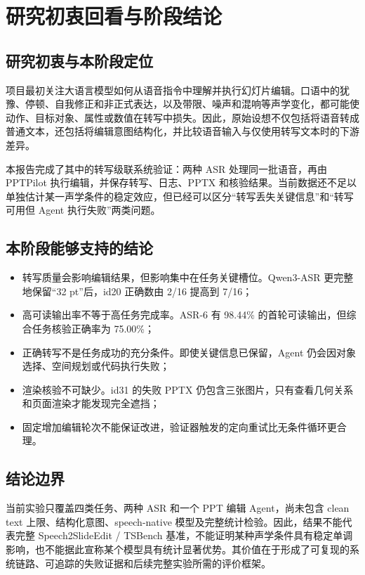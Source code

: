 \documentclass[11pt,a4paper,UTF8,fontset=fandol]{ctexart}
\begin{document}
\section{研究初衷回看与阶段结论}

\subsection{研究初衷与本阶段定位}

项目最初关注大语言模型如何从语音指令中理解并执行幻灯片编辑。口语中的犹豫、停顿、自我修正和非正式表达，以及带限、噪声和混响等声学变化，都可能使动作、目标对象、属性或数值在转写中损失。因此，原始设想不仅包括将语音转成普通文本，还包括将编辑意图结构化，并比较语音输入与仅使用转写文本时的下游差异。

本报告完成了其中的转写级联系统验证：两种 ASR 处理同一批语音，再由 PPTPilot 执行编辑，并保存转写、日志、PPTX 和核验结果。当前数据还不足以单独估计某一声学条件的稳定效应，但已经可以区分“转写丢失关键信息”和“转写可用但 Agent 执行失败”两类问题。

\subsection{本阶段能够支持的结论}

\begin{itemize}
  \item 转写质量会影响编辑结果，但影响集中在任务关键槽位。Qwen3-ASR 更完整地保留“32 pt”后，id20 正确数由 2/16 提高到 7/16；
  \item 高可读输出率不等于高任务完成率。ASR-6 有 98.44\% 的首轮可读输出，但综合任务核验正确率为 75.00\%；
  \item 正确转写不是任务成功的充分条件。即使关键信息已保留，Agent 仍会因对象选择、空间规划或代码执行失败；
  \item 渲染核验不可缺少。id31 的失败 PPTX 仍包含三张图片，只有查看几何关系和页面渲染才能发现完全遮挡；
  \item 固定增加编辑轮次不能保证改进，验证器触发的定向重试比无条件循环更合理。
\end{itemize}

\subsection{结论边界}

当前实验只覆盖四类任务、两种 ASR 和一个 PPT 编辑 Agent，尚未包含 clean text 上限、结构化意图、speech-native 模型及完整统计检验。因此，结果不能代表完整 Speech2SlideEdit / TSBench 基准，不能证明某种声学条件具有稳定单调影响，也不能据此宣称某个模型具有统计显著优势。其价值在于形成了可复现的系统链路、可追踪的失败证据和后续完整实验所需的评价框架。
\end{document}
